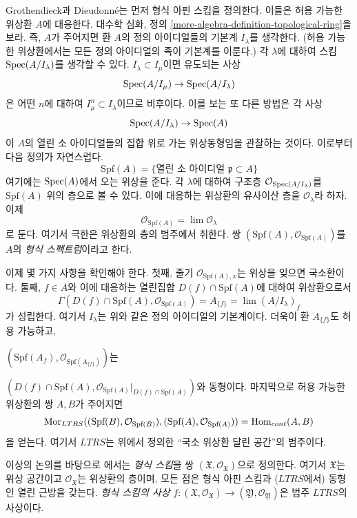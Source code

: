 \medskip\noindent
Grothendieck과 Dieudonn\'e는 먼저 형식 아핀 스킴을 정의한다.
이들은 허용 가능한 위상환 $A$에 대응한다. 대수학 심화, 정의
\ref{more-algebra-definition-topological-ring}을 보라.
즉, $A$가 주어지면 환 $A$의 정의 아이디얼들의 기본계
$I_\lambda$를 생각한다. (허용 가능한 위상환에서는 모든 정의
아이디얼의 족이 기본계를 이룬다.) 각 $\lambda$에 대하여 스킴
$\mathop{\mathrm{Spec}}(A/I_\lambda)$를 생각할 수 있다.
$I_\lambda \subset I_\mu$이면 유도되는 사상
$$
\mathop{\mathrm{Spec}}(A/I_\mu) \to \mathop{\mathrm{Spec}}(A/I_\lambda)
$$
은 어떤 $n$에 대하여 $I_\mu^n \subset I_\lambda$이므로 비후이다.
이를 보는 또 다른 방법은 각 사상
$$
\mathop{\mathrm{Spec}}(A/I_\lambda) \to \mathop{\mathrm{Spec}}(A)
$$
이 $A$의 열린 소 아이디얼들의 집합 위로 가는 위상동형임을
관찰하는 것이다. 이로부터 다음 정의가 자연스럽다.
$$
\text{Spf}(A) = \{\text{열린 소 아이디얼 }\mathfrak p \subset A\}
$$
여기에는 $\mathop{\mathrm{Spec}}(A)$에서 오는 위상을 준다. 각 $\lambda$에 대하여
구조층 $\mathcal{O}_{\mathop{\mathrm{Spec}}(A/I_\lambda)}$를 $\text{Spf}(A)$ 위의
층으로 볼 수 있다. 이에 대응하는 위상환의 유사이산 층을
$\mathcal{O}_\lambda$라 하자. 이제
$$
\mathcal{O}_{\text{Spf}(A)} = \lim \mathcal{O}_\lambda
$$
로 둔다. 여기서 극한은 위상환의 층의 범주에서 취한다.
쌍 $(\text{Spf}(A), \mathcal{O}_{\text{Spf}(A)})$를 $A$의
{\it 형식 스펙트럼}이라고 한다.

\medskip\noindent
이제 몇 가지 사항을 확인해야 한다. 첫째, 줄기
$\mathcal{O}_{\text{Spf}(A), x}$는 위상을 잊으면 국소환이다.
둘째, $f \in A$와 이에 대응하는 열린집합
$D(f) \cap \text{Spf}(A)$에 대하여 위상환으로서
$$
\Gamma(D(f) \cap \text{Spf}(A), \mathcal{O}_{\text{Spf}(A)})
= A_{\{f\}} = \lim (A/I_\lambda)_f
$$
가 성립한다. 여기서 $I_\lambda$는 위와 같은 정의 아이디얼의
기본계이다. 더욱이 환 $A_{\{f\}}$도 허용 가능하고,
\par\noindent
$(\text{Spf}(A_f), \mathcal{O}_{\text{Spf}(A_{\{f\}})})$는
\par\noindent
$(D(f) \cap \text{Spf}(A),
\mathcal{O}_{\text{Spf}(A)}|_{D(f) \cap \text{Spf}(A)})$와 동형이다.
마지막으로 허용 가능한 위상환의 쌍 $A, B$가 주어지면
\begin{equation}
\label{equation-morphisms-affine-formal-schemes}
\mathop{\mathrm{Mor}}\nolimits_{LTRS}((\text{Spf}(B), \mathcal{O}_{\text{Spf}(B)}),
(\text{Spf}(A), \mathcal{O}_{\text{Spf}(A)}))
= \mathop{\mathrm{Hom}}\nolimits_{cont}(A, B)
\end{equation}
을 얻는다. 여기서 $LTRS$는 위에서 정의한 ``국소 위상환 달린 공간''의
범주이다.

\medskip\noindent
이상의 논의를 바탕으로 \cite{EGA}에서는 {\it 형식 스킴}을 쌍
$(\mathfrak X, \mathcal{O}_\mathfrak X)$으로 정의한다. 여기서
$\mathfrak X$는 위상 공간이고 $\mathcal{O}_\mathfrak X$는 위상환의
층이며, 모든 점은 형식 아핀 스킴과 ($LTRS$에서) 동형인 열린 근방을
갖는다. {\it 형식 스킴의 사상}
$f : (\mathfrak X, \mathcal{O}_\mathfrak X) \to
(\mathfrak Y, \mathcal{O}_\mathfrak Y)$은 범주 $LTRS$의 사상이다.

